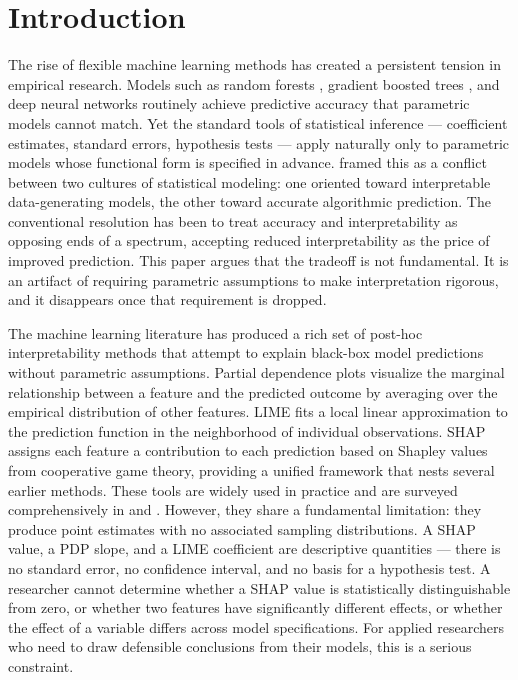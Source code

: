 \documentclass[12pt]{article}
\begin{document}
	\section{Introduction}
	
	The rise of flexible machine learning methods has created a persistent tension in
	empirical research. Models such as random forests \citep{breiman2001rf}, gradient
	boosted trees \citep{chen2016xgboost}, and deep neural networks \citep{hastie2009esl}
	routinely achieve predictive accuracy that parametric models cannot match. Yet the
	standard tools of statistical inference --- coefficient estimates, standard errors,
	hypothesis tests --- apply naturally only to parametric models whose functional form
	is specified in advance. \citet{breiman2001cultures} framed this as a conflict between
	two cultures of statistical modeling: one oriented toward interpretable
	data-generating models, the other toward accurate algorithmic prediction. The
	conventional resolution has been to treat accuracy and interpretability as opposing
	ends of a spectrum, accepting reduced interpretability as the price of improved
	prediction. This paper argues that the tradeoff is not fundamental. It is an artifact
	of requiring parametric assumptions to make interpretation rigorous, and it disappears
	once that requirement is dropped.
	
	The machine learning literature has produced a rich set of post-hoc interpretability
	methods that attempt to explain black-box model predictions without parametric
	assumptions. Partial dependence plots \citep{friedman2001pdp} visualize the marginal
	relationship between a feature and the predicted outcome by averaging over the
	empirical distribution of other features. LIME \citep{ribeiro2016lime} fits a local
	linear approximation to the prediction function in the neighborhood of individual
	observations. SHAP \citep{lundberg2017shap} assigns each feature a contribution to
	each prediction based on Shapley values from cooperative game theory, providing a
	unified framework that nests several earlier methods. These tools are widely used in
	practice and are surveyed comprehensively in \citet{molnar2025} and
	\citet{doshivelez2017interpretability}. However, they share a fundamental limitation:
	they produce point estimates with no associated sampling distributions. A SHAP value,
	a PDP slope, and a LIME coefficient are descriptive quantities --- there is no
	standard error, no confidence interval, and no basis for a hypothesis test. A
	researcher cannot determine whether a SHAP value is statistically distinguishable
	from zero, or whether two features have significantly different effects, or whether
	the effect of a variable differs across model specifications. For applied researchers
	who need to draw defensible conclusions from their models, this is a serious
	constraint.
	
\end{document}
